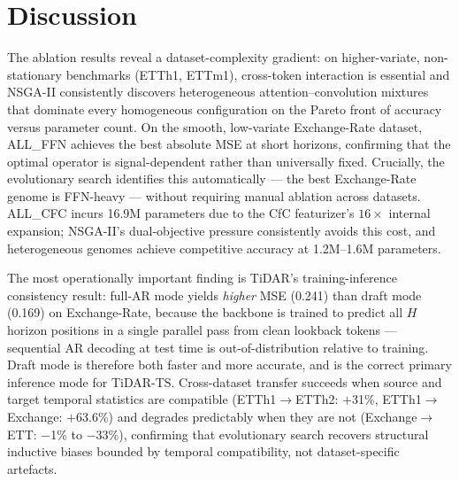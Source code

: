 \section{Discussion}
\label{sec:discussion}

The ablation results reveal a dataset-complexity gradient: on higher-variate, non-stationary benchmarks (ETTh1, ETTm1), cross-token interaction is essential and NSGA-II consistently discovers heterogeneous attention--convolution mixtures that dominate every homogeneous configuration on the Pareto front of accuracy versus parameter count.
On the smooth, low-variate Exchange-Rate dataset, ALL\_FFN achieves the best absolute MSE at short horizons, confirming that the optimal operator is signal-dependent rather than universally fixed.
Crucially, the evolutionary search identifies this automatically — the best Exchange-Rate genome is FFN-heavy — without requiring manual ablation across datasets.
ALL\_CFC incurs 16.9M parameters due to the CfC featurizer's $16{\times}$ internal expansion; NSGA-II's dual-objective pressure consistently avoids this cost, and heterogeneous genomes achieve competitive accuracy at 1.2M--1.6M parameters.

The most operationally important finding is TiDAR's training-inference consistency result: full-AR mode yields \emph{higher} MSE (0.241) than draft mode (0.169) on Exchange-Rate, because the backbone is trained to predict all $H$ horizon positions in a single parallel pass from clean lookback tokens — sequential AR decoding at test time is out-of-distribution relative to training.
Draft mode is therefore both faster and more accurate, and is the correct primary inference mode for TiDAR-TS.
Cross-dataset transfer succeeds when source and target temporal statistics are compatible (ETTh1$\to$ETTh2: $+$31\%, ETTh1$\to$Exchange: $+$63.6\%) and degrades predictably when they are not (Exchange$\to$ETT: $-$1\% to $-$33\%), confirming that evolutionary search recovers structural inductive biases bounded by temporal compatibility, not dataset-specific artefacts.
